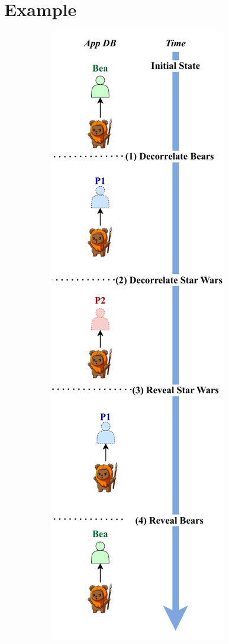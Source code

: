 \section{Example}
 \label{s:semantics:example}  
%
\begin{figure}
    \centering
    \begin{subfigure}[t]{.47\columnwidth}
    \centering
    \includegraphics[width=.75\textwidth]{figs/composition-hl-inorder}

\end{subfigure}
\end{figure}
